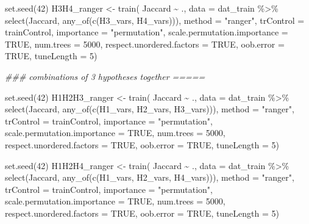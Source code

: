 \documentclass[
  letterpaper,
  DIV=11,
  numbers=noendperiod]{scrreprt}
\newenvironment{Shaded}{\begin{snugshade}}{\end{snugshade}}
\newcommand{\AttributeTok}[1]{\textcolor[rgb]{0.40,0.45,0.13}{#1}}
\newcommand{\ConstantTok}[1]{\textcolor[rgb]{0.56,0.35,0.01}{#1}}
\newcommand{\DecValTok}[1]{\textcolor[rgb]{0.68,0.00,0.00}{#1}}
\newcommand{\DocumentationTok}[1]{\textcolor[rgb]{0.37,0.37,0.37}{\textit{#1}}}
\newcommand{\FunctionTok}[1]{\textcolor[rgb]{0.28,0.35,0.67}{#1}}
\newcommand{\NormalTok}[1]{\textcolor[rgb]{0.00,0.23,0.31}{#1}}
\newcommand{\OtherTok}[1]{\textcolor[rgb]{0.00,0.23,0.31}{#1}}
\newcommand{\SpecialCharTok}[1]{\textcolor[rgb]{0.37,0.37,0.37}{#1}}
\newcommand{\StringTok}[1]{\textcolor[rgb]{0.13,0.47,0.30}{#1}}
\begin{document}
\begin{Shaded}
\begin{Highlighting}[]
\FunctionTok{set.seed}\NormalTok{(}\DecValTok{42}\NormalTok{)}
\NormalTok{H3H4\_ranger }\OtherTok{\textless{}{-}} \FunctionTok{train}\NormalTok{(}
\NormalTok{    Jaccard }\SpecialCharTok{\textasciitilde{}}\NormalTok{ .,}
    \AttributeTok{data =}\NormalTok{ dat\_train }\SpecialCharTok{\%\textgreater{}\%} \FunctionTok{select}\NormalTok{(Jaccard, }\FunctionTok{any\_of}\NormalTok{(}\FunctionTok{c}\NormalTok{(H3\_vars, H4\_vars))),}
    \AttributeTok{method =} \StringTok{"ranger"}\NormalTok{,}
    \AttributeTok{trControl =}\NormalTok{ trainControl,}
    \AttributeTok{importance =} \StringTok{"permutation"}\NormalTok{,}
    \AttributeTok{scale.permutation.importance =} \ConstantTok{TRUE}\NormalTok{,}
    \AttributeTok{num.trees =} \DecValTok{5000}\NormalTok{,}
    \AttributeTok{respect.unordered.factors =} \ConstantTok{TRUE}\NormalTok{,}
    \AttributeTok{oob.error =} \ConstantTok{TRUE}\NormalTok{,}
    \AttributeTok{tuneLength =} \DecValTok{5}\NormalTok{)}


\DocumentationTok{\#\#\# combinations of 3 hypotheses together =====}

\FunctionTok{set.seed}\NormalTok{(}\DecValTok{42}\NormalTok{)}
\NormalTok{H1H2H3\_ranger }\OtherTok{\textless{}{-}} \FunctionTok{train}\NormalTok{(}
\NormalTok{    Jaccard }\SpecialCharTok{\textasciitilde{}}\NormalTok{ .,}
    \AttributeTok{data =}\NormalTok{ dat\_train }\SpecialCharTok{\%\textgreater{}\%} \FunctionTok{select}\NormalTok{(Jaccard, }\FunctionTok{any\_of}\NormalTok{(}\FunctionTok{c}\NormalTok{(H1\_vars, H2\_vars, H3\_vars))),}
    \AttributeTok{method =} \StringTok{"ranger"}\NormalTok{,}
    \AttributeTok{trControl =}\NormalTok{ trainControl,}
    \AttributeTok{importance =} \StringTok{"permutation"}\NormalTok{,}
    \AttributeTok{scale.permutation.importance =} \ConstantTok{TRUE}\NormalTok{,}
    \AttributeTok{num.trees =} \DecValTok{5000}\NormalTok{,}
    \AttributeTok{respect.unordered.factors =} \ConstantTok{TRUE}\NormalTok{,}
    \AttributeTok{oob.error =} \ConstantTok{TRUE}\NormalTok{,}
    \AttributeTok{tuneLength =} \DecValTok{5}\NormalTok{)}

\FunctionTok{set.seed}\NormalTok{(}\DecValTok{42}\NormalTok{)}
\NormalTok{H1H2H4\_ranger }\OtherTok{\textless{}{-}} \FunctionTok{train}\NormalTok{(}
\NormalTok{    Jaccard }\SpecialCharTok{\textasciitilde{}}\NormalTok{ .,}
    \AttributeTok{data =}\NormalTok{ dat\_train }\SpecialCharTok{\%\textgreater{}\%} \FunctionTok{select}\NormalTok{(Jaccard, }\FunctionTok{any\_of}\NormalTok{(}\FunctionTok{c}\NormalTok{(H1\_vars, H2\_vars, H4\_vars))),}
    \AttributeTok{method =} \StringTok{"ranger"}\NormalTok{,}
    \AttributeTok{trControl =}\NormalTok{ trainControl,}
    \AttributeTok{importance =} \StringTok{"permutation"}\NormalTok{,}
    \AttributeTok{scale.permutation.importance =} \ConstantTok{TRUE}\NormalTok{,}
    \AttributeTok{num.trees =} \DecValTok{5000}\NormalTok{,}
    \AttributeTok{respect.unordered.factors =} \ConstantTok{TRUE}\NormalTok{,}
    \AttributeTok{oob.error =} \ConstantTok{TRUE}\NormalTok{,}
    \AttributeTok{tuneLength =} \DecValTok{5}\NormalTok{)}


\end{Highlighting}
\end{Shaded}
\end{document}
